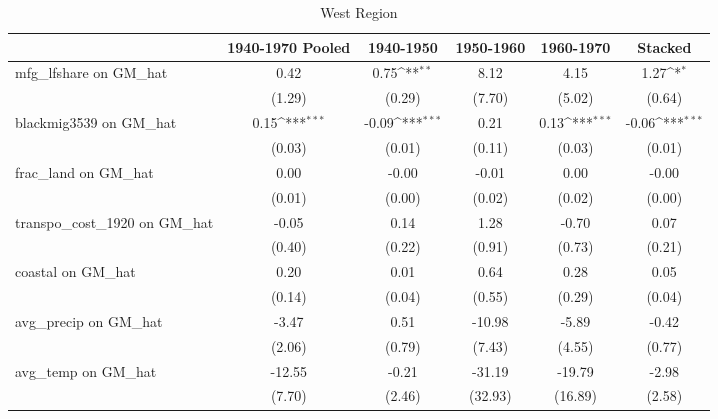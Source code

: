 \begin{table}[htbp]\centering
\def\sym#1{\ifmmode^{#1}\else\(^{#1}\)\fi}
\caption{West Region}
\begin{tabular}{l*{5}{c}}
\toprule
                &\multicolumn{1}{c}{1940-1970 Pooled}&\multicolumn{1}{c}{1940-1950}&\multicolumn{1}{c}{1950-1960}&\multicolumn{1}{c}{1960-1970}&\multicolumn{1}{c}{Stacked}\\
\midrule
mfg\_lfshare on GM\_hat&     0.42         &     0.75\sym{**} &     8.12         &     4.15         &     1.27\sym{*}  \\
                &   (1.29)         &   (0.29)         &   (7.70)         &   (5.02)         &   (0.64)         \\
\addlinespace
blackmig3539 on GM\_hat&     0.15\sym{***}&    -0.09\sym{***}&     0.21         &     0.13\sym{***}&    -0.06\sym{***}\\
                &   (0.03)         &   (0.01)         &   (0.11)         &   (0.03)         &   (0.01)         \\
\addlinespace
frac\_land on GM\_hat&     0.00         &    -0.00         &    -0.01         &     0.00         &    -0.00         \\
                &   (0.01)         &   (0.00)         &   (0.02)         &   (0.02)         &   (0.00)         \\
\addlinespace
transpo\_cost\_1920 on GM\_hat&    -0.05         &     0.14         &     1.28         &    -0.70         &     0.07         \\
                &   (0.40)         &   (0.22)         &   (0.91)         &   (0.73)         &   (0.21)         \\
\addlinespace
coastal on GM\_hat&     0.20         &     0.01         &     0.64         &     0.28         &     0.05         \\
                &   (0.14)         &   (0.04)         &   (0.55)         &   (0.29)         &   (0.04)         \\
\addlinespace
avg\_precip on GM\_hat&    -3.47         &     0.51         &   -10.98         &    -5.89         &    -0.42         \\
                &   (2.06)         &   (0.79)         &   (7.43)         &   (4.55)         &   (0.77)         \\
\addlinespace
avg\_temp on GM\_hat&   -12.55         &    -0.21         &   -31.19         &   -19.79         &    -2.98         \\
                &   (7.70)         &   (2.46)         &  (32.93)         &  (16.89)         &   (2.58)         \\

\end{tabular}
\end{table}
